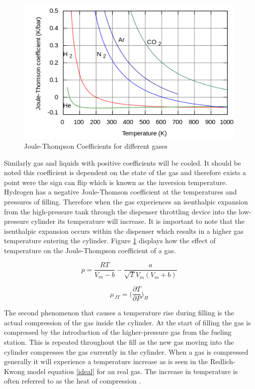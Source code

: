 \documentclass[paper=a4, fontsize=11pt, abstract=on]{scrartcl}
\numberwithin{equation}{section}		%
\numberwithin{figure}{section}			%
\numberwithin{table}{section}				%
\begin{document}
\begin{figure}[H]
\centering
\includegraphics[width=0.65\linewidth]{jt}
\caption{Joule-Thompson Coefficients for different gases}
\label{jt}
\end{figure}

Similarly gas and liquids with positive coefficients will be cooled. It should be noted this coefficient is dependent on the state of the gas and therefore exists a point were the sign can flip which is known as the inversion temperature. Hydrogen has a negative Joule-Thomson coefficient at the temperatures and pressures of filling. Therefore when the gas experiences an isenthalpic expansion from the high-pressure tank through the dispenser throttling device into the low-pressure cylinder its temperature will increase. It is important to note that the isenthalpic expansion occurs within the dispenser which results in a higher gas temperature entering the cylinder. Figure \ref{jt} displays how the effect of temperature on the Joule-Thompson coefficient of a gas.

\begin{equation}
\label{ideal}
p=\frac{RT}{V_m-b}-\frac{a}{\sqrt{T}V_m(V_m+b)}
\end{equation}

\begin{equation}
\label{jte}
\mu_{JT} = \Bigg(\frac{\partial T}{\partial P}\Bigg)_H
\end{equation}

The second phenomenon that causes a temperature rise during filling is the actual compression of the gas inside the cylinder. At the start of filling the gas is compressed by the introduction of the higher-pressure gas from the fueling station. This is repeated throughout the fill as the new gas moving into the cylinder compresses the gas currently in the cylinder. When a gas is compressed generally it will experience a temperature increase as is seen in the Redlich-Kwong model equation \ref{ideal} for an real gas. The increase in temperature is often referred to as the heat of compression \cite{dick}. 
\end{document}

